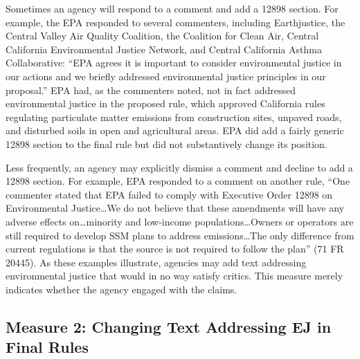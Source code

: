 \documentclass[
      12pt,
        ]{article}
\begin{document}
Sometimes an agency will respond to a comment and add a 12898 section. For example, the EPA responded to several commenters, including Earthjustice, the Central Valley Air Quality Coalition, the Coalition for Clean Air, Central California Environmental Justice Network, and Central California Asthma Collaborative: ``EPA agrees it is important to consider environmental justice in our actions and we briefly addressed environmental justice principles in our proposal.'' EPA had, as the commenters noted, not in fact addressed environmental justice in the proposed rule, which approved California rules regulating particulate matter emissions from construction sites, unpaved roads, and disturbed soils in open and agricultural areas. EPA did add a fairly generic 12898 section to the final rule but did not substantively change its position.

Less frequently, an agency may explicitly dismiss a comment and decline to add a 12898 section. For example, EPA responded to a comment on another rule, ``One commenter stated that EPA failed to comply with Executive Order 12898 on Environmental Justice\ldots We do not believe that these amendments will have any adverse effects on\ldots minority and low-income populations\ldots Owners or operators are still required to develop SSM plans to address emissions\ldots The only difference from current regulations is that the source is not required to follow the plan'' (71 FR 20445). As these examples illustrate, agencies may add text addressing environmental justice that would in no way satisfy critics. This measure merely indicates whether the agency engaged with the claims.

\hypertarget{measure-2-changing-text-addressing-ej-in-final-rules}{%
\subsection{Measure 2: Changing Text Addressing EJ in Final Rules}\label{measure-2-changing-text-addressing-ej-in-final-rules}}
\end{document}
